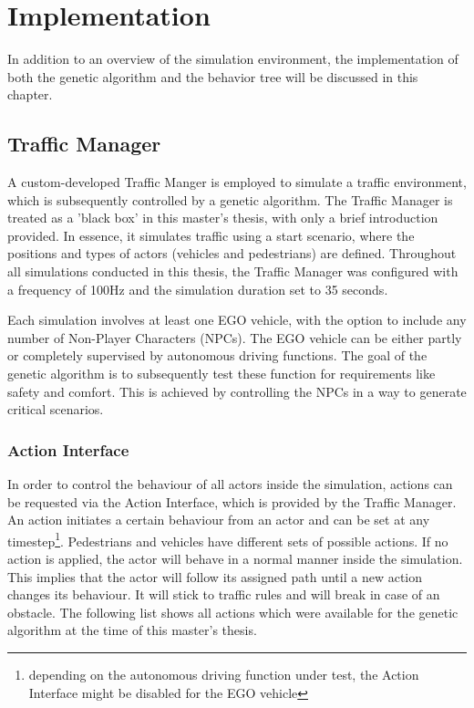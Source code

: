 \chapter{Implementation}
\label{chap:implementation}

In addition to an overview of the simulation environment, the implementation of both the genetic algorithm and the behavior tree will be discussed in this chapter.

\section{Traffic Manager}
A custom-developed Traffic Manger is employed to simulate a traffic environment, which is subsequently controlled by a genetic algorithm. The Traffic Manager is treated as a 'black box' in this master's thesis, with only a brief introduction provided. In essence, it simulates traffic using a start scenario, where the positions and types of actors (vehicles and pedestrians) are defined. Throughout all simulations conducted in this thesis, the Traffic Manager was configured with a frequency of 100Hz and the simulation duration set to 35 seconds.

Each simulation involves at least one EGO vehicle, with the option to include any number of Non-Player Characters (NPCs). The EGO vehicle can be either partly or completely supervised by autonomous driving functions. The goal of the genetic algorithm is to subsequently test these function for requirements like safety and comfort. This is achieved by controlling the NPCs in a way to generate critical scenarios.

\subsection{Action Interface}
\label{sect:implementation:action_interface}
In order to control the behaviour of all actors inside the simulation, actions can be requested via the Action Interface, which is provided by the Traffic Manager. An action initiates a certain behaviour from an actor and can be set at any timestep\footnote{depending on the autonomous driving function under test, the Action Interface might be disabled for the EGO vehicle}. Pedestrians and vehicles have different sets of possible actions. If no action is applied, the actor will behave in a normal manner inside the simulation. This implies that the actor will follow its assigned path until a new action changes its behaviour. It will stick to traffic rules and will break in case of an obstacle. The following list shows all actions which were available for the genetic algorithm at the time of this master's thesis.

